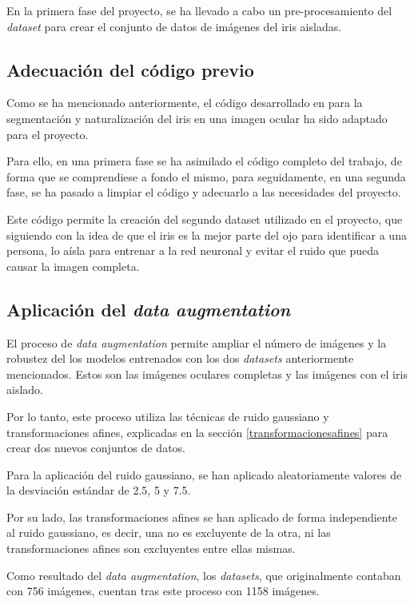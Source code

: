En la primera fase del proyecto, se ha llevado a cabo un pre-procesamiento del \textit{dataset} para crear el conjunto de datos de imágenes del iris aisladas.

\subsection{Adecuación del código previo}

Como se ha mencionado anteriormente, el código desarrollado en \cite{tfg_iris_2020} para la segmentación y naturalización del iris en una imagen ocular ha sido adaptado para el proyecto. 

Para ello, en una primera fase se ha asimilado el código completo del trabajo, de forma que se comprendiese a fondo el mismo, para seguidamente, en una segunda fase, se ha pasado a limpiar el código y adecuarlo a las necesidades del proyecto. 

Este código permite la creación del segundo dataset utilizado en el proyecto, que siguiendo con la idea de que el iris es la mejor parte del ojo para identificar a una persona, lo aísla para entrenar a la red neuronal y evitar el ruido que pueda causar la imagen completa. 


\subsection{Aplicación del \textit{data augmentation}}

El proceso de \textit{data augmentation} permite ampliar el número de imágenes y la robustez del los modelos entrenados con los dos \textit{datasets} anteriormente mencionados. Estos son las imágenes oculares completas y las imágenes con el iris aislado. 

Por lo tanto, este proceso utiliza las técnicas de ruido gaussiano y transformaciones afines, explicadas en la sección \ref{transformacionesafines} para crear dos nuevos conjuntos de datos. 

Para la aplicación del ruido gaussiano, se han aplicado aleatoriamente valores de la desviación estándar de 2.5, 5 y 7.5.

Por su lado, las transformaciones afines se han aplicado de forma independiente al ruido gaussiano, es decir, una no es excluyente de la otra, ni las transformaciones afines son excluyentes entre ellas mismas. 

Como resultado del \textit{data augmentation}, los \textit{datasets}, que originalmente contaban con 756 imágenes, cuentan tras este proceso con 1158 imágenes.

